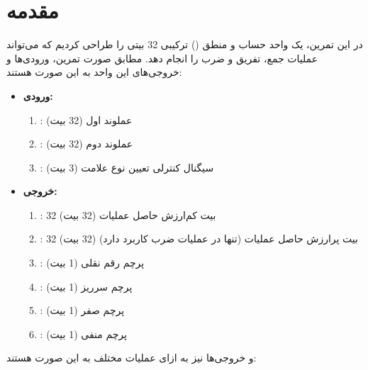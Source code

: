 \section{مقدمه}

در این تمرین، یک واحد حساب و منطق () ترکیبی 32 بیتی را طراحی کردیم که می‌تواند عملیات جمع، تفریق و ضرب را انجام دهد. مطابق صورت تمرین، ورودی‌ها و خروجی‌های این واحد به این صورت هستند:
\begin{itemize}
    \item \textbf{ورودی:}
          \begin{enumerate}
              \item \textbf{}: عملوند اول (32 بیت)
              \item \textbf{}: عملوند دوم (32 بیت)
              \item \textbf{{}}: سیگنال کنترلی تعیین نوع علامت (3 بیت)
          \end{enumerate}

    \item \textbf{خروجی:}
          \begin{enumerate}
              \item \textbf{}: 32 بیت کم‌ارزش حاصل عملیات (32 بیت)
              \item \textbf{}: 32 بیت پرارزش حاصل عملیات (تنها در عملیات ضرب کاربرد دارد) (32 بیت)
              \item \textbf{}: پرچم رقم نقلی (1 بیت)
              \item \textbf{}: پرچم سرریز (1 بیت)
              \item \textbf{}: پرچم صفر (1 بیت)
              \item \textbf{}: پرچم منفی (1 بیت)
          \end{enumerate}
\end{itemize}

و خروجی‌ها نیز به ازای عملیات مختلف به این صورت هستند:


